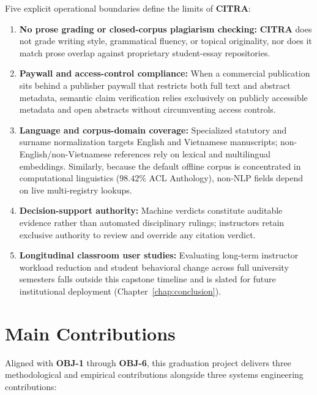Five explicit operational boundaries define the limits of \textbf{CITRA}:
\begin{enumerate}
    \item \textbf{No prose grading or closed-corpus plagiarism checking:} \textbf{CITRA} does not grade writing style, grammatical fluency, or topical originality, nor does it match prose overlap against proprietary student-essay repositories.
    \item \textbf{Paywall and access-control compliance:} When a commercial publication sits behind a publisher paywall that restricts both full text and abstract metadata, semantic claim verification relies exclusively on publicly accessible metadata and open abstracts without circumventing access controls.
    \item \textbf{Language and corpus-domain coverage:} Specialized statutory and surname normalization targets English and Vietnamese manuscripts; non-English/non-Vietnamese references rely on lexical and multilingual embeddings. Similarly, because the default offline corpus is concentrated in computational linguistics ($98.42\%$ ACL Anthology), non-NLP fields depend on live multi-registry lookups.
    \item \textbf{Decision-support authority:} Machine verdicts constitute auditable evidence rather than automated disciplinary rulings; instructors retain exclusive authority to review and override any citation verdict.
    \item \textbf{Longitudinal classroom user studies:} Evaluating long-term instructor workload reduction and student behavioral change across full university semesters falls outside this capstone timeline and is slated for future institutional deployment (Chapter~\ref{chap:conclusion}).
\end{enumerate}

\section{Main Contributions}

Aligned with \textbf{OBJ-1} through \textbf{OBJ-6}, this graduation project delivers three methodological and empirical contributions alongside three systems engineering contributions:

